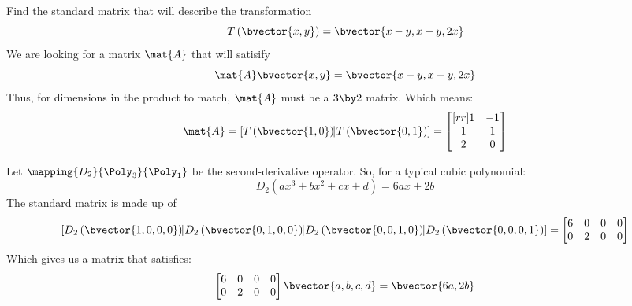 \documentclass{beamer}
\begin{document}
\begin{frame}
\begin{example}
Find the standard matrix that will describe the transformation
\begin{equation*}
T\left(\bvector{x,y}\right)=\bvector{x-y, x+y, 2x}
\end{equation*}\pause
We are looking for a matrix $\mat{A}$ that will satisify
\begin{equation*}
\mat{A}\bvector{x,y}=\bvector{x-y, x+y, 2x}
\end{equation*}\pause
Thus, for dimensions in the product to match, $\mat{A}$ must be a $3\by 2$ matrix. Which means:
\begin{equation*}
\mat{A} = \left[ T\left(\bvector{1,0}\right)\vrule T\left(\bvector{0,1}\right)\right]=
\begin{bmatrix}[rr]
1 & -1 \\
1 &  1 \\
2 &  0 \\
\end{bmatrix}
\end{equation*}
\end{example}
\end{frame}

\begin{frame}
\begin{example}
Let $\mapping{D_2}{\Poly_3}{\Poly_1}$ be the second-derivative operator. So, for a typical cubic polynomial:
\begin{equation*}
D_2(a x^3 + b x^2 + c x + d)=6ax+2b
\end{equation*}\pause
The standard matrix is made up of
\begin{equation*}
\left[
D_2\left(\bvector{1,0,0,0}\right)\vrule
D_2\left(\bvector{0,1,0,0}\right)\vrule
D_2\left(\bvector{0,0,1,0}\right)\vrule
D_2\left(\bvector{0,0,0,1}\right)
\right]
=
\begin{bmatrix}
6 & 0 & 0 & 0 \\
0 & 2 & 0 & 0 \\
\end{bmatrix}
\end{equation*}\pause
Which gives us a matrix that satisfies:
\begin{equation*}
\begin{bmatrix}
6 & 0 & 0 & 0 \\
0 & 2 & 0 & 0 \\
\end{bmatrix}
\bvector{a,b,c,d}=\bvector{6a,2b}
\end{equation*}
\end{example}
\end{frame}
\end{document}
